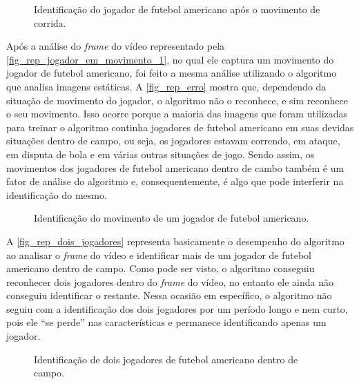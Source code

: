 \begin{figure}[ht]
	\caption{\label{fig_rep_jogador_em_movimento_2}Identificação do jogador de futebol americano após o movimento de corrida.}
	\begin{center}
	\end{center}
	\centering {}
\end{figure}

Após a análise do \textit{frame} do vídeo representado pela \autoref{fig_rep_jogador_em_movimento_1}, no qual ele captura um movimento do jogador de futebol americano, foi feito a mesma análise utilizando o algoritmo que analisa imagens estáticas. A \autoref{fig_rep_erro} mostra que, dependendo da situação de movimento do jogador, o algoritmo não o reconhece, e sim reconhece o seu movimento. Isso ocorre porque a maioria das imagens que foram utilizadas para treinar o algoritmo continha jogadores de futebol americano em suas devidas situações dentro de campo, ou seja, os jogadores estavam correndo, em ataque, em disputa de bola e em várias outras situações de jogo. Sendo assim, os movimentos dos jogadores de futebol americano dentro de cambo também é um fator de análise do algoritmo e, consequentemente, é algo que pode interferir na identificação do mesmo.

\begin{figure}[ht]
	\caption{\label{fig_rep_erro}Identificação do movimento de um jogador de futebol americano.}
	\begin{center}
	\end{center}
	\centering {}
\end{figure}


A \autoref{fig_rep_dois_jogadores} representa basicamente o desempenho do algoritmo ao analisar o \textit{frame} do vídeo e identificar mais de um jogador de futebol americano dentro de campo. Como pode ser visto, o algoritmo conseguiu reconhecer dois jogadores dentro do \textit{frame} do vídeo, no entanto ele ainda não conseguiu identificar o restante. Nessa ocasião em específico, o algoritmo não seguiu com a identificação dos dois jogadores por um período longo e nem curto, pois ele “se perde” nas características e permanece identificando apenas um jogador.

\begin{figure}[ht]
	\caption{\label{fig_rep_dois_jogadores}Identificação de dois jogadores de futebol americano dentro de campo.}
	\begin{center}
	\end{center}
	\centering {}
\end{figure}

